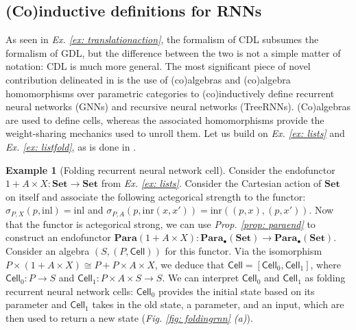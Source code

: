 \documentclass[11pt,a4paper,openright,twoside]{report}
\newcounter{mycounter}
\theoremstyle{plain}
\theoremstyle{definition}
\newtheorem{example}[mycounter]{Example}
\begin{document}
\subsection{(Co)inductive definitions for RNNs}

As seen in \textit{Ex. \ref{ex: translationaction}}, the formalism of CDL subsumes the formalism of GDL, but the difference between the two is not a simple matter of notation: CDL is much more general. The most significant piece of novel contribution delineated in \cite{gavranovicposition} is the use of (co)algebras and (co)algebra homomorphisms over parametric categories to (co)inductively define recurrent neural networks (GNNs) and recursive neural networks (TreeRNNs). (Co)algebras are used to define cells, whereas the associated homomorphisms provide the weight-sharing mechanics used to unroll them. Let us build on \textit{Ex. \ref{ex: lists}} and \textit{Ex. \ref{ex: listfold}}, as is done in \cite{gavranovicposition}.

\begin{example}[Folding recurrent neural network cell]
  \label{ex: frnncell}
  Consider the endofunctor $1 + A \times X: \mathbf{Set} \to \mathbf{Set}$ from \textit{Ex. \ref{ex: lists}}. Consider the Cartesian action of $\mathbf{Set}$ on itself and associate the following actegorical strength to the functor: $\sigma_{P,X}(p,\mathrm{inl}) = \mathrm{inl}$ and  $\sigma_{P,A}(p,\mathrm{inr}(x,x')) = \mathrm{inr}((p,x), (p,x'))$. Now that the functor is actegorical strong, we can use \textit{Prop. \ref{prop: paraend}} to construct an endofunctor $\mathbf{Para}(1 + A \times X): \mathbf{Para}_{\bullet}(\mathbf{Set}) \to \mathbf{Para}_{\bullet}(\mathbf{Set})$. Consider an algebra $(S,(P,\mathsf{Cell}))$ for this functor. Via the isomorphism $P \times (1 + A \times X) \cong P + P \times A \times X$, we deduce that $\mathsf{Cell} = [\mathsf{Cell}_0, \mathsf{Cell}_1]$, where $\mathsf{Cell}_0: P \to S$ and  $\mathsf{Cell}_1: P \times A \times S \to S$. We can interpret $\mathsf{Cell}_0$ and $\mathsf{Cell}_1$ as folding recurrent neural network cells: $\mathsf{Cell}_0$ provides the initial state based on its parameter and $\mathsf{Cell}_1$ takes in the old state, a parameter, and an input, which are then used to return a new state (\textit{Fig. \ref{fig: foldingrnn} (a)}).
\end{example}
\end{document}
